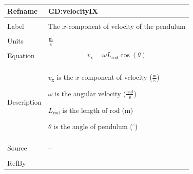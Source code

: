 \documentclass[12pt]{article}
\begin{document}
\vspace{\baselineskip}
\noindent
\begin{minipage}{\textwidth}
\begin{tabular}{>{\raggedright}p{}>{\raggedright\arraybackslash}p{}}
\toprule \textbf{Refname} & \textbf{GD:velocityIX}
\label{GD:velocityIX}
\\ \midrule \\
Label & The $x$-component of velocity of the pendulum
        
\\ \midrule \\
Units & $\frac{\text{m}}{\text{s}}$
        
\\ \midrule \\
Equation & \begin{displaymath}
           {v_{\text{x}}}=ω {L_{\text{rod}}} \cos\left(θ\right)
           \end{displaymath}
\\ \midrule \\
Description & \begin{symbDescription}
              \item{${v_{\text{x}}}$ is the $x$-component of velocity ($\frac{\text{m}}{\text{s}}$)}
              \item{$ω$ is the angular velocity ($\frac{\text{rad}}{\text{s}}$)}
              \item{${L_{\text{rod}}}$ is the length of rod (${\text{m}}$)}
              \item{$θ$ is the angle of pendulum (${{}^{\circ}}$)}
              \end{symbDescription}
\\ \midrule \\
Source & --
         
\\ \midrule \\
RefBy & 
\\ \bottomrule
\end{tabular}
\end{minipage}
\end{document}
